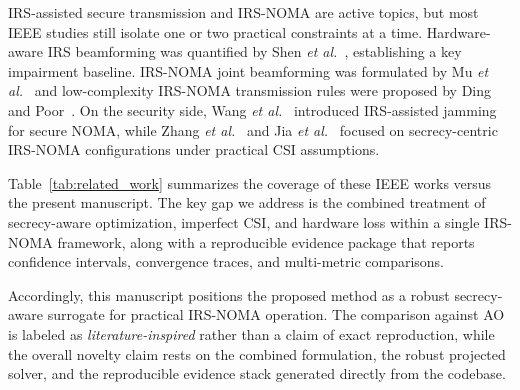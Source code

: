IRS-assisted secure transmission and IRS-NOMA are active topics, but most IEEE studies still isolate one or two practical constraints at a time. Hardware-aware IRS beamforming was quantified by Shen \emph{et al.}~\cite{shen2021_tcom}, establishing a key impairment baseline. IRS-NOMA joint beamforming was formulated by Mu \emph{et al.}~\cite{mu2020_twc} and low-complexity IRS-NOMA transmission rules were proposed by Ding and Poor~\cite{ding2020_lcomm}. On the security side, Wang \emph{et al.}~\cite{wang2022_twc} introduced IRS-assisted jamming for secure NOMA, while Zhang \emph{et al.}~\cite{zhang2022_tcom} and Jia \emph{et al.}~\cite{jia2023_lcomm} focused on secrecy-centric IRS-NOMA configurations under practical CSI assumptions.

Table~\ref{tab:related_work} summarizes the coverage of these IEEE works versus the present manuscript. The key gap we address is the combined treatment of secrecy-aware optimization, imperfect CSI, and hardware loss within a single IRS-NOMA framework, along with a reproducible evidence package that reports confidence intervals, convergence traces, and multi-metric comparisons.

Accordingly, this manuscript positions the proposed method as a robust secrecy-aware surrogate for practical IRS-NOMA operation. The comparison against AO is labeled as \emph{literature-inspired} rather than a claim of exact reproduction, while the overall novelty claim rests on the combined formulation, the robust projected solver, and the reproducible evidence stack generated directly from the codebase.
